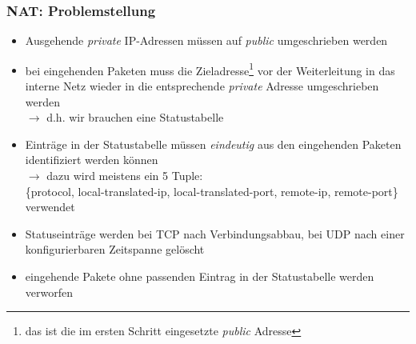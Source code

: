 \documentclass[ignorenonframetext]{beamer}
\begin{document}
\begin{frame}
\frametitle{NAT: Problemstellung}
\begin{itemize}
	\item{Ausgehende {\em private} IP-Adressen m\"ussen auf {\em public} umgeschrieben werden}
	\item{bei eingehenden Paketen muss die Zieladresse\footnote{das ist die im ersten Schritt eingesetzte {\em public} Adresse} vor der Weiterleitung in das interne Netz wieder in die entsprechende {\em private} Adresse umgeschrieben werden}\\
	$\rightarrow$ d.h. wir brauchen eine Statustabelle
	\item{Eintr\"age in der Statustabelle m\"ussen {\em eindeutig} aus den eingehenden Paketen identifiziert werden k\"onnen}\\
	$\rightarrow$ dazu wird meistens ein 5 Tuple:\\
	{\small \{protocol, local-translated-ip, local-translated-port, remote-ip, remote-port\}}\\
	verwendet
	\item{Statuseintr\"age werden bei TCP nach Verbindungsabbau, bei UDP nach einer konfigurierbaren Zeitspanne gel\"oscht}
	\item{eingehende Pakete ohne passenden Eintrag in der Statustabelle werden verworfen}
\end{itemize}
\end{frame}
\end{document}
